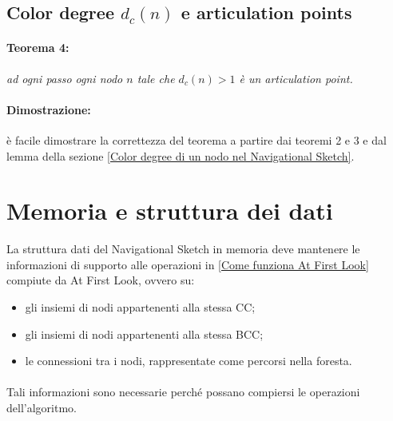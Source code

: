 \documentclass[a4paper,11pt]{report}
\begin{document}
\subsection{Color degree $d_c(n)$ e articulation points}\label{Color degree e articulation points}
\paragraph{Teorema 4:}\emph{ad ogni passo ogni nodo $n$ tale che $d_c(n) > 1$ è un \emph{articulation point}.}
\paragraph{Dimostrazione:} è facile dimostrare la correttezza del teorema a partire dai teoremi 2 e 3 e dal lemma della sezione \ref{Color
degree di un nodo nel Navigational Sketch}.

\section{Memoria e struttura dei dati}
La struttura dati del Navigational Sketch in memoria deve mantenere le informazioni di supporto alle operazioni in \ref{Come funziona At
First Look} compiute da At First Look, ovvero 
su:
\begin{itemize}
 \item gli insiemi di nodi appartenenti alla stessa CC;
 \item gli insiemi di nodi appartenenti alla stessa BCC;
 \item le connessioni tra i nodi, rappresentate come percorsi nella foresta.
\end{itemize}
\paragraph{}
Tali informazioni sono necessarie perché possano compiersi le operazioni dell'algoritmo.
\end{document}
